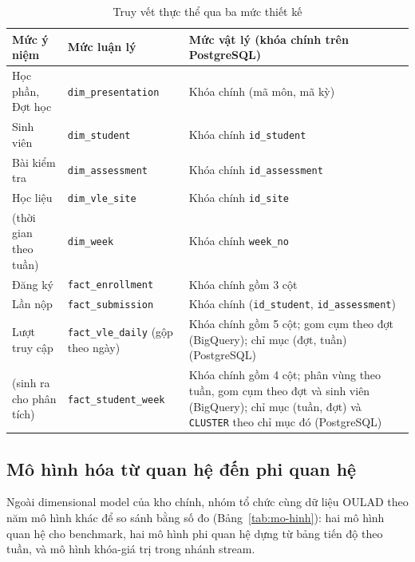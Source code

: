\begin{table}[htbp]
\centering
\small
\begin{tabularx}{\textwidth}{|l|l|X|}
\hline
\textbf{Mức ý niệm} & \textbf{Mức luận lý} & \textbf{Mức vật lý (khóa chính trên PostgreSQL)} \\ \hline
Học phần, Đợt học & \texttt{dim\_presentation} & Khóa chính (mã môn, mã kỳ) \\ \hline
Sinh viên & \texttt{dim\_student} & Khóa chính \texttt{id\_student} \\ \hline
Bài kiểm tra & \texttt{dim\_assessment} & Khóa chính \texttt{id\_assessment} \\ \hline
Học liệu & \texttt{dim\_vle\_site} & Khóa chính \texttt{id\_site} \\ \hline
(thời gian theo tuần) & \texttt{dim\_week} & Khóa chính \texttt{week\_no} \\ \hline
Đăng ký & \texttt{fact\_enrollment} & Khóa chính gồm 3 cột \\ \hline
Lần nộp & \texttt{fact\_submission} & Khóa chính (\texttt{id\_student}, \texttt{id\_assessment}) \\ \hline
Lượt truy cập & \texttt{fact\_vle\_daily} (gộp theo ngày) & Khóa chính gồm 5 cột; gom cụm theo đợt (BigQuery); chỉ mục (đợt, tuần) (PostgreSQL) \\ \hline
(sinh ra cho phân tích) & \texttt{fact\_student\_week} & Khóa chính gồm 4 cột; phân vùng theo tuần, gom cụm theo đợt và sinh viên (BigQuery); chỉ mục (tuần, đợt) và \texttt{CLUSTER} theo chỉ mục đó (PostgreSQL) \\ \hline
\end{tabularx}
\caption{Truy vết thực thể qua ba mức thiết kế}
\label{tab:truy-vet}
\end{table}

\subsection{Mô hình hóa từ quan hệ đến phi quan hệ}
\label{sec:phi-quan-he}

Ngoài dimensional model của kho chính, nhóm tổ chức cùng dữ liệu OULAD theo năm mô hình khác để so sánh bằng số đo (Bảng~\ref{tab:mo-hinh}): hai mô hình quan hệ cho benchmark, hai mô hình phi quan hệ dựng từ bảng tiến độ theo tuần, và mô hình khóa-giá trị trong nhánh stream.

